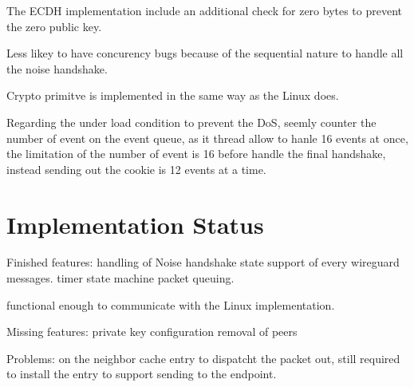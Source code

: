   The ECDH implementation include an additional check for zero bytes to prevent the zero public 
  key.

  Less likey to have concurency bugs because of the sequential nature to handle all the noise 
  handshake. 

  Crypto primitve is implemented in the same way as the Linux does.

  Regarding the under load condition to prevent the DoS, seemly counter the number of event on the
  event queue, as it thread allow to hanle 16 events at once, the limitation of the number of
  event is 16 before handle the final handshake, instead sending out the cookie is 12 events at a time.
\section{Implementation Status}
  Finished features:
    handling of Noise handshake state 
    support of every wireguard messages.
    timer state machine
    packet queuing.

  functional enough to communicate with the Linux implementation.
  
  Missing features:
    private key configuration
    removal of peers

  Problems:
     on the neighbor cache entry to dispatcht the packet out, still required to install
     the entry to support sending to the endpoint. 